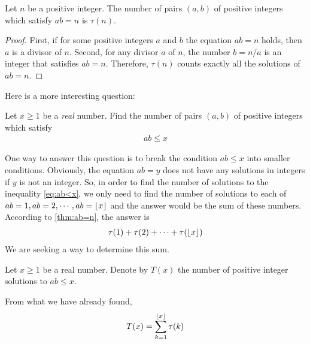 \begin{theorem}\label{thm:ab=n}
	Let $n$ be a positive integer. The number of pairs $(a,b)$ of positive integers which satisfy $ab=n$ is $\tau(n)$.
\end{theorem}

\begin{proof}
	First, if for some positive integers $a$ and $b$ the equation $ab = n$ holds, then $a$ is a divisor of $n$. Second, for any divisor $a$ of $n$, the number $b = n/a$ is an integer that satisfies $ab = n$. Therefore, $\tau(n)$ counts exactly all the solutions of $ab=n$.
\end{proof}
Here is a more interesting question:
\begin{question}
	Let $x \geq 1$ be a \textit{real} number. Find the number of pairs $(a, b)$ of positive integers which satisfy
		\begin{align}
			ab \leq x \label{eq:ab<x}
		\end{align}
\end{question}

One way to answer this question is to break the condition $ab \leq x$ into smaller conditions. Obviously, the equation $ab = y$ does not have any solutions in integers if $y$ is not an integer. So, in order to find the number of solutions to the inequality \ref{eq:ab<x}, we only need to find the number of solutions to each of $ab = 1, ab= 2, \cdots, ab=\left\lfloor{x}\right\rfloor$ and the answer would be the sum of these numbers. According to \autoref{thm:ab=n}, the answer is
\begin{align*}
	\tau(1) + \tau(2) + \cdots + \tau(\left\lfloor{x}\right\rfloor)
\end{align*}
We are seeking a way to determine this sum.

\begin{definition}
	Let $x \geq 1$ be a real number. Denote by $T(x)$ the number of positive integer solutions to $ab \leq x$.
\end{definition}

From what we have already found,
\begin{align}
	T(x) = \sum_{k=1}^{\left\lfloor{x}\right\rfloor} \tau(k)\label{eq:T(x)-1}
\end{align}


